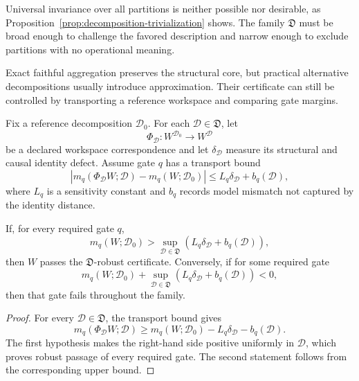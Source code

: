 Universal invariance over all partitions is neither possible nor desirable,
as Proposition~\ref{prop:decomposition-trivialization} shows. The family
\(\mathfrak D\) must be broad enough to challenge the favored description and
narrow enough to exclude partitions with no operational meaning.


Exact faithful aggregation preserves the structural core, but practical
alternative decompositions usually introduce approximation. Their certificate
can still be controlled by transporting a reference workspace and comparing
gate margins.

Fix a reference decomposition \(\mathcal D_0\). For each
\(\mathcal D\in\mathfrak D\), let
\[
\Phi_{\mathcal D}:W^{\mathcal D_0}\longrightarrow W^{\mathcal D}
\]
be a declared workspace correspondence and let
\(\delta_{\mathcal D}\) measure its structural and causal identity defect.
Assume gate \(q\) has a transport bound
\[
\left|
 m_q(\Phi_{\mathcal D}W;\mathcal D)
 -m_q(W;\mathcal D_0)
\right|
\leq
L_q\delta_{\mathcal D}+b_q(\mathcal D),
\]
where \(L_q\) is a sensitivity constant and \(b_q\) records model mismatch not
captured by the identity distance.

\begin{theorem}
\label{thm:decomposition-robustness}
If, for every required gate \(q\),
\[
\boxed{
 m_q(W;\mathcal D_0)
>
\sup_{\mathcal D\in\mathfrak D}
\left(
L_q\delta_{\mathcal D}+b_q(\mathcal D)
\right),
}
\]
then \(W\) passes the \(\mathfrak D\)-robust certificate. Conversely, if for
some required gate
\[
 m_q(W;\mathcal D_0)
+
\sup_{\mathcal D\in\mathfrak D}
\left(
L_q\delta_{\mathcal D}+b_q(\mathcal D)
\right)
<0,
\]
then that gate fails throughout the family.
\end{theorem}

\begin{proof}
For every \(\mathcal D\in\mathfrak D\), the transport bound gives
\[
 m_q(\Phi_{\mathcal D}W;\mathcal D)
\geq
m_q(W;\mathcal D_0)
-
L_q\delta_{\mathcal D}
-
b_q(\mathcal D).
\]
The first hypothesis makes the right-hand side positive uniformly in
\(\mathcal D\), which proves robust passage of every required gate. The second
statement follows from the corresponding upper bound.
\end{proof}

